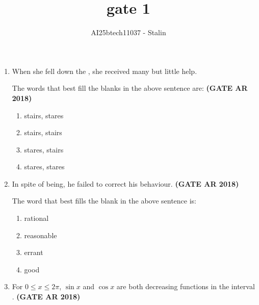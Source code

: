 \documentclass[journal,15pt,onecolumn]{IEEEtran}
\theoremstyle{remark}
\begin{document}
\title{gate 1}
\author{AI25btech11037 - Stalin}
\maketitle
\renewcommand{\thefigure}{\theenumi}
\renewcommand{\thetable}{\theenumi}




\begin{enumerate}


  



\item 
When she fell down the \underline{\hspace{1cm}}, she received many \underline{\hspace{1cm}} but little help.

\vspace{0.5cm}

\hspace{1.3cm}The words that best fill the blanks in the above sentence are:\hfill \textbf{ (GATE AR 2018)}



\begin{enumerate}
\item   stairs, stares
\item  stairs, stairs 
\item  stares, stairs 
\item  stares, stares 
\end{enumerate}




\item 
In spite of being, he failed to correct his \underline{\hspace{2cm}} behaviour.\hfill \textbf{ (GATE AR 2018)}

 The word that best fills the blank in the above sentence is:
\begin{enumerate}
\item   rational 
\item   reasonable 
\item   errant 
\item   good 
\end{enumerate}


\vspace{01cm}


\item  For  $ 0 \leq x \leq 2\pi  $,  $ \sin x  $ and  $ \cos x  $ are both decreasing functions in the interval \underline{\hspace{1cm}}.\hfill \textbf{ (GATE AR 2018)}


\end{enumerate}
\end{document}
